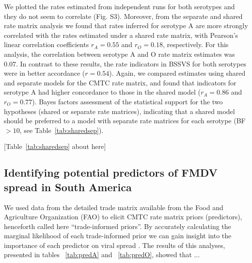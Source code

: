 \documentclass[10pt]{article}
\begin{document}
We plotted the rates estimated from independent runs for both serotypes and they do not seem to correlate (Fig. S3). %
Moreover, from the separate and shared rate matrix analysis we found that rates inferred for serotype A are more strongly correlated with the rates estimated under a shared rate matrix, with Pearson's linear correlation coefficients $r_A=0.55$ and $r_O=0.18$, respectively.
For this analysis, the correlation between serotype A and O rate matrix estimates was $0.07$.
In contrast to these results, the rate indicators in BSSVS for both serotypes were in better accordance ($r=0.54$).
Again, we compared estimates using shared and separate models for the CMTC rate matrix, and found that indicators for serotype A had higher concordance to those in the shared model ($r_A=0.86$ and $r_O=0.77$).
Bayes factors assessment of the statistical support for the two hypotheses (shared or separate rate matrices), indicating that a shared model should be preferred to a model with separate rate matrices for each serotype (BF$>10$, see Table~\ref{tab:sharedsep}).

\begin{center}
 [Table~\ref{tab:sharedsep} about here]
\end{center}

\subsection*{Identifying potential predictors of FMDV spread in South America}

We used data from the detailed trade matrix available from the Food and Agriculture Organization (FAO) to elicit CMTC rate matrix priors (predictors), henceforth called here ``trade-informed priors''.
By accurately calculating the marginal likelihood of each trade-informed prior we can gain insight into the importance of each predictor on viral spread \cite{Carvalho2012,Nelson2011}.
The results of this analyses, presented in tables ~\ref{tab:predA} and ~\ref{tab:predO}, showed that ... %

\end{document}
